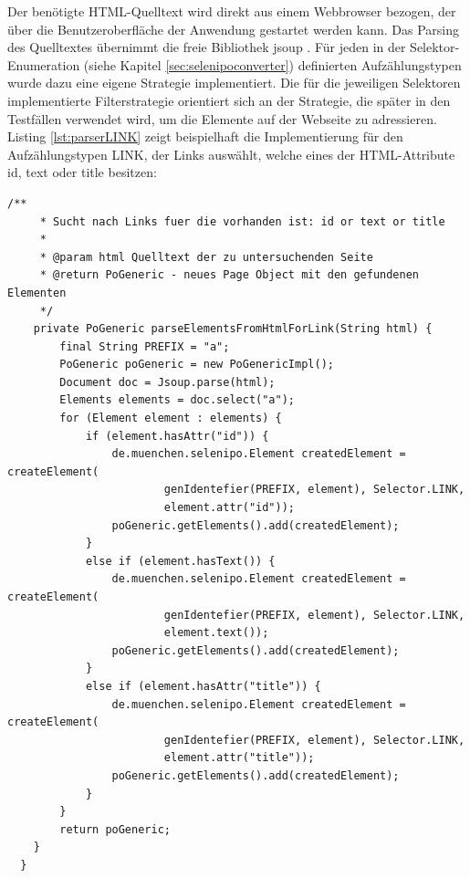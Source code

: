 Der benötigte HTML-Quelltext wird direkt aus einem Webbrowser bezogen, der über die Benutzeroberfläche der Anwendung gestartet werden kann.
Das Parsing des Quelltextes übernimmt die freie Bibliothek jsoup \cite{hedley_jsoup_2015}.
Für jeden in der Selektor-Enumeration (siehe Kapitel \ref{sec:selenipoconverter}) definierten Aufzählungstypen wurde dazu eine eigene Strategie implementiert. 
Die für die jeweiligen Selektoren implementierte Filterstrategie orientiert sich an der Strategie, die später in den Testfällen verwendet wird, um die Elemente auf der Webseite zu adressieren.\\
Listing \ref{lst:parserLINK} zeigt beispielhaft die Implementierung für den Aufzählungstypen LINK, der Links auswählt, welche eines der HTML-Attribute id, text oder title besitzen:
\begin{lstlisting}[caption={Parser für den Aufzählungstypen LINK},label={lst:parserLINK}]
 	/**
	 * Sucht nach Links fuer die vorhanden ist: id or text or title
	 *
	 * @param html Quelltext der zu untersuchenden Seite
	 * @return PoGeneric - neues Page Object mit den gefundenen Elementen
	 */
	private PoGeneric parseElementsFromHtmlForLink(String html) {
		final String PREFIX = "a";
		PoGeneric poGeneric = new PoGenericImpl();
		Document doc = Jsoup.parse(html);
		Elements elements = doc.select("a");
		for (Element element : elements) {
			if (element.hasAttr("id")) {
				de.muenchen.selenipo.Element createdElement = createElement(
						genIdentefier(PREFIX, element), Selector.LINK,
						element.attr("id"));
				poGeneric.getElements().add(createdElement);
			}
			else if (element.hasText()) {
				de.muenchen.selenipo.Element createdElement = createElement(
						genIdentefier(PREFIX, element), Selector.LINK,
						element.text());
				poGeneric.getElements().add(createdElement);
			}
			else if (element.hasAttr("title")) {
				de.muenchen.selenipo.Element createdElement = createElement(
						genIdentefier(PREFIX, element), Selector.LINK,
						element.attr("title"));
				poGeneric.getElements().add(createdElement);
			}
		}
		return poGeneric;
	}
  }
  
\end{lstlisting} 

